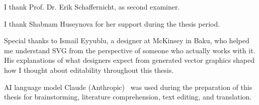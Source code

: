 I thank Prof. Dr. Erik Schaffernicht, as second examiner.

I thank Shabnam Huseynova for her support during the thesis period.

Special thanks to Ismail Eyyublu, a designer at McKinsey in Baku, 
who helped me understand SVG from the perspective of someone who actually works with it. 
His explanations of what designers expect from generated vector graphics shaped 
how I thought about editability throughout this thesis.


AI language model Claude (Anthropic)~\cite{claude2026} was used during the preparation of this thesis for brainstorming, literature comprehension, 
text editing, and translation. 
